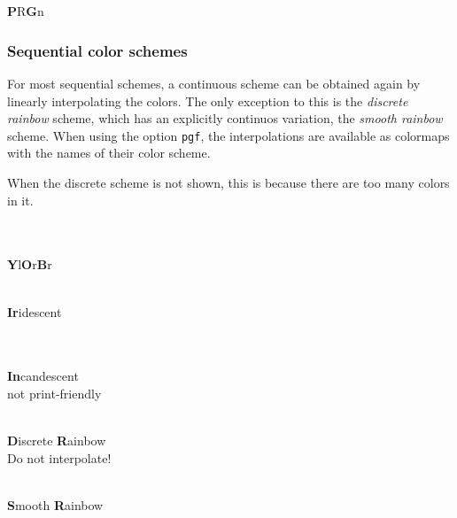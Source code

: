 \documentclass{scrartcl}
\begin{document}
\begin{center}
    \\
    \\
    \textbf{P}R\textbf{G}n
\end{center}\clearpage

\subsubsection{Sequential color schemes}\label{sec:T-S}
For most sequential schemes, a continuous scheme can be obtained again by linearly interpolating the colors.
The only exception to this is the \emph{discrete rainbow} scheme, which has an explicitly continuos variation, the \emph{smooth rainbow} scheme.
When using the option \verb!pgf!, the interpolations are available as colormaps with the names of their color scheme.

When the discrete scheme is not shown, this is because there are too many colors in it.

\begin{center}
    \\
    \\
    \textbf{Y}l\textbf{O}r\textbf{B}r
\end{center}

\begin{center}
    \\
    \textbf{Ir}idescent
\end{center}

\begin{center}
    \\
    \\
    \textbf{In}candescent\\
    not print-friendly
\end{center}

\begin{center}
    \\
    \textbf{D}iscrete \textbf{R}ainbow\\
    Do not interpolate!
\end{center}

\begin{center}
    \\
    \textbf{S}mooth \textbf{R}ainbow\\
\end{center}\clearpage
\end{document}
